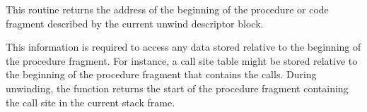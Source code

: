This routine returns the address of the beginning of the procedure or
code fragment described by the current unwind descriptor block.

This information is required to access any data stored relative to the
beginning of the procedure fragment. For instance, a call site table
might be stored relative to the beginning of the procedure fragment
that contains the calls. During unwinding, the function returns the
start of the procedure fragment containing the call site in the current
stack frame.

%
%
%
%
%
%
%
%

